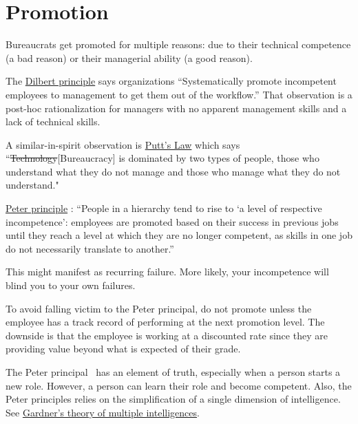 \section{Promotion\label{sec:promotion}}

Bureaucrats get promoted for multiple reasons: due to their technical competence (a bad reason) or their managerial ability (a good reason).  

The \href{https://en.wikipedia.org/wiki/Dilbert_principle}{Dilbert principle}
says organizations
``Systematically promote incompetent employees to management to get them out of the workflow.''
That observation is a post-hoc rationalization for managers with no apparent management skills and a lack of technical skills. 

A similar-in-spirit observation is 
\href{https://en.wikipedia.org/wiki/Putt\%27s_Law_and_the_Successful_Technocrat}{Putt's Law}
which says
``\sout{Technology}[Bureaucracy] is dominated by two types of people, those who understand what they do not manage and those who manage what they do not understand."


\href{https://en.wikipedia.org/wiki/Peter_principle}{Peter principle}
: 
``People in a hierarchy tend to rise to `a level of respective incompetence': employees are promoted based on their success in previous jobs until they reach a level at which they are no longer competent, as skills in one job do not necessarily translate to another.''

This might manifest as recurring failure. More likely, your incompetence will blind you to your own failures.

To avoid falling victim to the Peter principal, do not promote unless the employee has a track record of performing at the next promotion level. The downside is that the employee is working at a discounted rate since they are providing value beyond what is expected of their grade.


The Peter principal~\cite{1970_Peter} has an element of truth, especially when a person starts a new role. However, a person can learn their role and become competent. Also, the Peter principles relies on the simplification of a single dimension of intelligence. 
See \href{https://en.wikipedia.org/wiki/Theory_of_multiple_intelligences}{Gardner's theory of multiple intelligences}.


